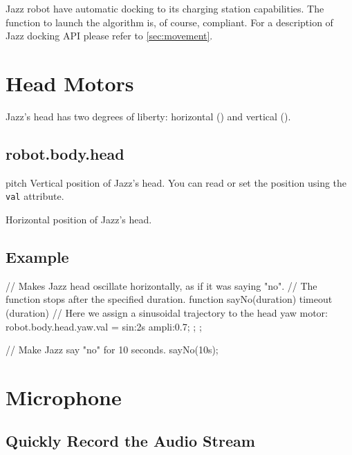Jazz robot have automatic docking to its charging station capabilities. The
function to launch the algorithm is, of course, \gsrapi compliant. For a
description of Jazz docking API please refer to \autoref{sec:movement}.

\section{Head Motors}

Jazz's head has two degrees of liberty: horizontal
() and vertical
().

\subsection{robot.body.head}

\begin{urbiscriptapi}
\item[pitch] Vertical position of Jazz's head. You can read or set the
  position using the \lstinline{val} attribute.


\item[yaw] Horizontal position of Jazz's head.
\end{urbiscriptapi}

\subsection{Example}

\begin{urbiunchecked}
// Makes Jazz head oscillate horizontally, as if it was saying "no".
// The function stops after the specified duration.
function sayNo(duration)
{
  timeout (duration) {
    // Here we assign a sinusoidal trajectory to the head yaw motor:
    robot.body.head.yaw.val = sin:2s ampli:0.7;
  };
};

// Make Jazz say "no" for 10 seconds.
sayNo(10s);
\end{urbiunchecked}

\section{Microphone}

\subsection{Quickly Record the Audio Stream}

